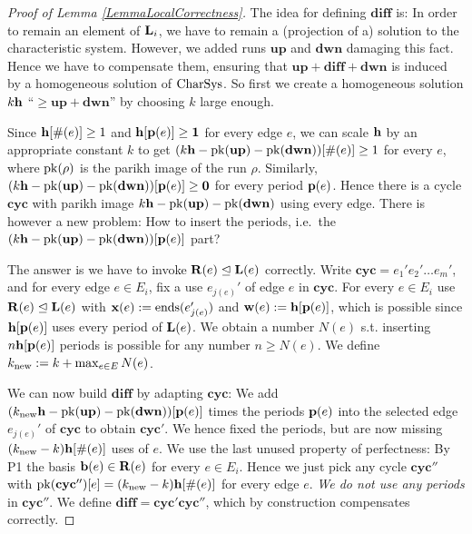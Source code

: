 \begin{proof}[Proof of Lemma \ref{LemmaLocalCorrectness}]
The idea for defining \(\mathbf{diff}\) is: In order to remain an element of \(\mathbf{L}_i\), we have to remain a (projection of a) solution to the characteristic system. However, we added runs \(\mathbf{up}\) and \(\mathbf{dwn}\) damaging this fact. Hence we have to compensate them, ensuring that \(\mathbf{up}+\mathbf{diff}+\mathbf{dwn}\) is induced by a homogeneous solution of \(\operatorname{CharSys}\). So first we create a homogeneous solution \(k \mathbf{h}\) ``\(\geq \mathbf{up}+\mathbf{dwn}\)'' by choosing \(k\) large enough.

Since \(\mathbf{h}[\#(e)] \geq 1\) and \(\mathbf{h}[\mathbf{p}(e)] \geq \mathbf{1}\) for every edge \(e\), we can scale \(\mathbf{h}\) by an appropriate constant \(k\) to get \((k\mathbf{h}-\operatorname{pk}(\mathbf{up})-\operatorname{pk}(\mathbf{dwn}))[\#(e)] \geq 1\) for every \(e\), where \(\operatorname{pk}(\rho)\) is the parikh image of the run \(\rho\). Similarly, \((k \mathbf{h}-\operatorname{pk}(\mathbf{up})-\operatorname{pk}(\mathbf{dwn}))[\mathbf{p}(e)] \geq \mathbf{0}\) for every period \(\mathbf{p}(e)\). Hence there is a cycle \(\mathbf{cyc}\) with parikh image \(k \mathbf{h}-\operatorname{pk}(\mathbf{up})-\operatorname{pk}(\mathbf{dwn})\) using every edge. There is however a new problem: How to insert the periods, i.e.\ the \((k \mathbf{h}-\operatorname{pk}(\mathbf{up})-\operatorname{pk}(\mathbf{dwn}))[\mathbf{p}(e)]\) part?

The answer is we have to invoke \(\mathbf{R}(e) \trianglelefteq \mathbf{L}(e)\) correctly. Write \(\mathbf{cyc}=e_1' e_2' \dots e_m'\), and for every edge \(e \in E_i\), fix a use \(e_{j(e)}'\) of edge \(e\) in \(\mathbf{cyc}\). For every \(e\in E_i\) use \(\mathbf{R}(e) \trianglelefteq \mathbf{L}(e)\) with \(\mathbf{x}(e):=\operatorname{ends}(e_{j(e)}')\) and \(\mathbf{w}(e):=\mathbf{h}[\mathbf{p}(e)]\), which is possible since \(\mathbf{h}[\mathbf{p}(e)]\) uses every period of \(\mathbf{L}(e)\). We obtain a number \(N(e)\) s.t. inserting \(n \mathbf{h}[\mathbf{p}(e)]\) periods is possible for any number \(n \geq N(e)\). We define \(k_{\text{new}}:=k+\max_{e \in E} N(e)\).

We can now build \(\mathbf{diff}\) by adapting \(\mathbf{cyc}\): We add \((k_{\text{new}} \mathbf{h}-\operatorname{pk}(\mathbf{up})-\operatorname{pk}(\mathbf{dwn}))[\mathbf{p}(e)]\) times the periods \(\mathbf{p}(e)\) into the selected edge \(e_{j(e)}'\) of \(\mathbf{cyc}\) to obtain \(\mathbf{cyc}'\). We hence fixed the periods, but are now missing \((k_{\text{new}}-k)\mathbf{h}[\#(e)]\) uses of \(e\). We use the last unused property of perfectness: By P1 the basis \(\mathbf{b}(e)\in \mathbf{R}(e)\) for every \(e \in E_i\). Hence we just pick any cycle \(\mathbf{cyc}''\) with \(\operatorname{pk}(\mathbf{cyc}'')[e]=(k_{\text{new}}-k)\mathbf{h}[\#(e)]\) for every edge \(e\). \emph{We do not use any periods} in \(\mathbf{cyc}''\). We define \(\mathbf{diff}=\mathbf{cyc}' \mathbf{cyc}''\), which by construction compensates correctly.


\end{proof}

